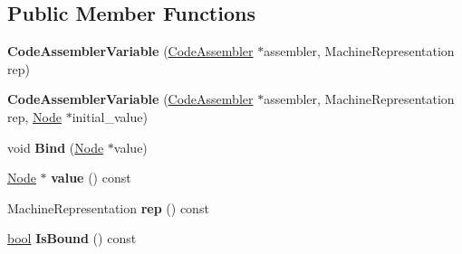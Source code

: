 \subsection*{Public Member Functions}
\begin{DoxyCompactItemize}
\item 
\mbox{\label{classv8_1_1internal_1_1compiler_1_1CodeAssemblerVariable_a1e92c1651788135481490b4709f08f7d}} 
{\bfseries Code\+Assembler\+Variable} (\mbox{\hyperlink{classv8_1_1internal_1_1compiler_1_1CodeAssembler}{Code\+Assembler}} $\ast$assembler, Machine\+Representation rep)
\item 
\mbox{\label{classv8_1_1internal_1_1compiler_1_1CodeAssemblerVariable_a0b65e709ee9b34c63ec10fcc8de98b26}} 
{\bfseries Code\+Assembler\+Variable} (\mbox{\hyperlink{classv8_1_1internal_1_1compiler_1_1CodeAssembler}{Code\+Assembler}} $\ast$assembler, Machine\+Representation rep, \mbox{\hyperlink{classv8_1_1internal_1_1compiler_1_1Node}{Node}} $\ast$initial\+\_\+value)
\item 
\mbox{\label{classv8_1_1internal_1_1compiler_1_1CodeAssemblerVariable_a92d7d26e6102fb8da8e476c247772080}} 
void {\bfseries Bind} (\mbox{\hyperlink{classv8_1_1internal_1_1compiler_1_1Node}{Node}} $\ast$value)
\item 
\mbox{\label{classv8_1_1internal_1_1compiler_1_1CodeAssemblerVariable_a2b1490882b5ada31bbd46ae3d11af3f8}} 
\mbox{\hyperlink{classv8_1_1internal_1_1compiler_1_1Node}{Node}} $\ast$ {\bfseries value} () const
\item 
\mbox{\label{classv8_1_1internal_1_1compiler_1_1CodeAssemblerVariable_a767f7551a2608a774bdeba2fcaf2d197}} 
Machine\+Representation {\bfseries rep} () const
\item 
\mbox{\label{classv8_1_1internal_1_1compiler_1_1CodeAssemblerVariable_ae7ca17a880c6274f311cec495d0ba67c}} 
\mbox{\hyperlink{classbool}{bool}} {\bfseries Is\+Bound} () const
\end{DoxyCompactItemize}
